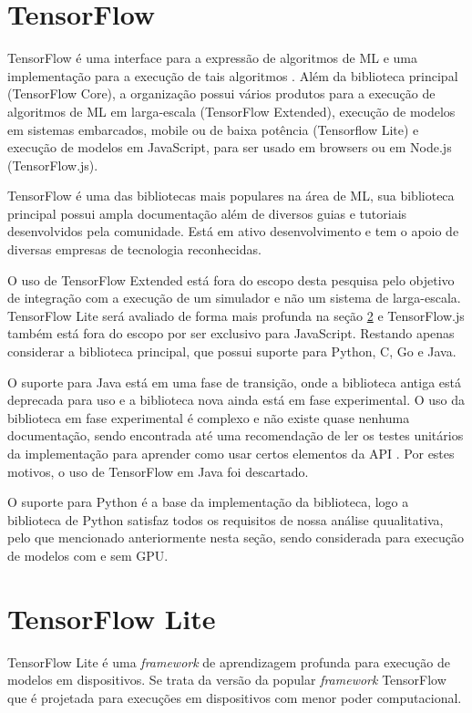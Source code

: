 \section{TensorFlow}

TensorFlow é uma interface para a expressão de algoritmos de ML e uma implementação para a execução de tais algoritmos \cite{tensorflow-2015}. Além da biblioteca principal (TensorFlow Core), a organização possui vários produtos para a execução de algoritmos de ML em larga-escala (TensorFlow Extended), execução de modelos em sistemas embarcados, mobile ou de baixa potência (Tensorflow Lite) e execução de modelos em JavaScript, para ser usado em browsers ou em Node.js (TensorFlow.js).

TensorFlow é uma das bibliotecas mais populares na área de ML, sua biblioteca principal possui ampla documentação além de diversos guias e tutoriais desenvolvidos pela comunidade. Está em ativo desenvolvimento e tem o apoio de diversas empresas de tecnologia reconhecidas.

O uso de TensorFlow Extended está fora do escopo desta pesquisa pelo objetivo de integração com a execução de um simulador e não um sistema de larga-escala. TensorFlow Lite será avaliado de forma mais profunda na seção \ref{tensorflow-lite} e TensorFlow.js também está fora do escopo por ser exclusivo para JavaScript. Restando apenas considerar a biblioteca principal, que possui suporte para Python, C, Go e Java.

O suporte para Java está em uma fase de transição, onde a biblioteca antiga está deprecada para uso e a biblioteca nova ainda está em fase experimental. O uso da biblioteca em fase experimental é complexo e não existe quase nenhuma documentação, sendo encontrada até uma recomendação de ler os testes unitários da implementação para aprender como usar certos elementos da API \cite{tensorflow-unit-test-recommendation}. Por estes motivos, o uso de TensorFlow em Java foi descartado.

O suporte para Python é a base da implementação da biblioteca, logo a biblioteca de Python satisfaz todos os requisitos de nossa análise quualitativa, pelo que mencionado anteriormente nesta seção, sendo considerada para execução de modelos com e sem GPU.

\section{TensorFlow Lite}
\label{tensorflow-lite}

TensorFlow Lite \cite{ml_site_tensorflow_lite} é uma \textit{framework} de aprendizagem profunda para execução de modelos em dispositivos. Se trata da versão da popular \textit{framework} TensorFlow que é projetada para execuções em dispositivos com menor poder computacional.

